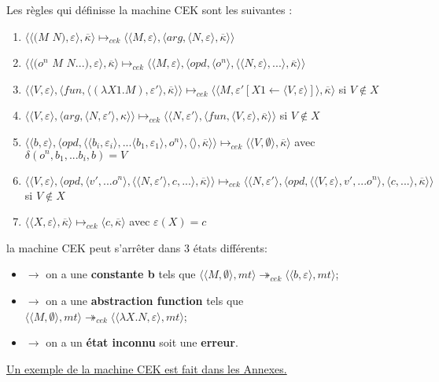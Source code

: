 \documentclass[10pt,a4paper]{article}
\begin{document}
				
				Les règles qui définisse la machine CEK sont les suivantes :
				\begin{enumerate}
					\item $\langle\langle(M$ $N),\varepsilon\rangle,\overline{\kappa}\rangle \longmapsto_{cek} \langle \langle M,\varepsilon\rangle,\langle arg,\langle N,\varepsilon\rangle,\overline{\kappa}\rangle\rangle$
					\item $\langle\langle(o^{n}$ $M$ $N...),\varepsilon\rangle,\overline{\kappa}\rangle \longmapsto_{cek} \langle \langle M,\varepsilon\rangle,\langle opd,\langle o^{n}\rangle,\langle \langle N,\varepsilon\rangle,...\rangle,\overline{\kappa}\rangle\rangle$
					\item $\langle\langle V,\varepsilon\rangle,\langle fun,\langle (\lambda X1.M),\varepsilon'\rangle,\overline{\kappa} \rangle \rangle \longmapsto_{cek} \langle \langle M,\varepsilon'[X1 \leftarrow \langle V,\varepsilon\rangle]\rangle,\overline{\kappa}\rangle$ si $V \notin X$
					\item  $\langle \langle V,\varepsilon\rangle,\langle arg,\langle N,\varepsilon'\rangle,\kappa\rangle\rangle \longmapsto_{cek} \langle \langle N,\varepsilon'\rangle,\langle fun,\langle V,\varepsilon\rangle,\overline{\kappa}\rangle\rangle$ si $V \notin X$
					\item $\langle  \langle b,\varepsilon\rangle,\langle opd,\langle \langle b_{i},\varepsilon_{i}\rangle,...\langle b_{1},\varepsilon_{1}\rangle ,o^{n}\rangle,\langle\rangle,\overline{\kappa}\rangle\rangle \longmapsto_{cek} \langle \langle V,\emptyset\rangle,\overline{\kappa}\rangle$ avec $\delta(o^{n},b_{1},...b_{i},b) = V$
					\item $\langle \langle V,\varepsilon\rangle,\langle opd,\langle v',...o^{n}\rangle,\langle  \langle N,\varepsilon'\rangle,c,...\rangle,\overline{\kappa}\rangle\rangle \longmapsto_{cek} \langle \langle N,\varepsilon'\rangle,\langle opd,\langle  \langle V,\varepsilon\rangle,v',...o^{n}\rangle,\langle c,...\rangle,\overline{\kappa}\rangle\rangle$ si $V \notin X$	
					\item $\langle\langle X,\varepsilon\rangle,\overline{\kappa}\rangle \longmapsto_{cek} \langle c,\overline{\kappa}\rangle$ avec $\varepsilon(X) = c$
				\end{enumerate}
				\bigbreak
				
				
				la machine CEK peut s'arrêter dans 3 états différents:
				\begin{itemize}
					\item[]$\longrightarrow$ on a une \textbf{constante b} tels que $\langle \langle M,\emptyset\rangle,mt\rangle \twoheadrightarrow_{cek} \langle\langle b,\varepsilon\rangle,mt\rangle$;
					\item[]$\longrightarrow$ on a une \textbf{abstraction function} tels que $\langle \langle M,\emptyset\rangle,mt\rangle \twoheadrightarrow_{cek} \langle\langle \lambda X.N,\varepsilon\rangle,mt\rangle$;
					\item[]$\longrightarrow$ on a un \textbf{état inconnu} soit une \textbf{erreur}.
				\end{itemize}
				\hyperref[CEK]{Un exemple de la machine CEK est fait dans les Annexes.}
				\bigbreak
				
\end{document}
